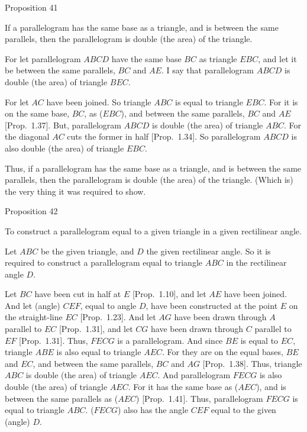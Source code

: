 
\begin{center}
{\large Proposition 41}
\end{center}

If a parallelogram has the same base as a triangle, and is between
the same parallels, then the parallelogram is double (the area) of the triangle.

\epsfysize=1.9in
\centerline{}

For let parallelogram $ABCD$ have the same base $BC$ as triangle $EBC$,
and let it be between the same parallels, $BC$ and $AE$. I say that 
parallelogram $ABCD$ is double (the area) of triangle $BEC$.

For let $AC$ have been joined. So triangle $ABC$ is equal to triangle
$EBC$. For it is on the same base, $BC$,  as ($EBC$), and between the same
parallels, $BC$ and $AE$ [Prop.~1.37]. But, parallelogram $ABCD$
is double (the area) of triangle $ABC$. For the diagonal $AC$ cuts
the former in half [Prop.~1.34]. So parallelogram $ABCD$ is also
double (the area) of triangle $EBC$.

Thus, if a parallelogram has the same base as a triangle, and is between
the same parallels, then the parallelogram is double (the area) of the triangle.
(Which is) the very thing it was required to show.


\begin{center}
{\large Proposition 42}
\end{center}

To construct a parallelogram equal to a given triangle in a given
rectilinear angle.

Let $ABC$ be the given triangle, and $D$ the given rectilinear angle. So
it is required to construct a parallelogram equal to triangle $ABC$
in the rectilinear angle $D$.

\epsfysize=1.9in
\centerline{}

Let $BC$ have been cut in half at $E$ [Prop.~1.10], and let $AE$ have been joined. And let (angle) $CEF$, equal to angle $D$,  have been constructed
at the point $E$ on the straight-line $EC$ [Prop.~1.23]. And let $AG$ have been drawn through $A$
parallel to $EC$ [Prop.~1.31], and let $CG$ have been drawn through $C$ parallel
to $EF$ [Prop.~1.31]. Thus, $FECG$ is a parallelogram. And since $BE$ is
equal to $EC$, triangle $ABE$ is also equal to triangle $AEC$. For they are
on the equal bases, $BE$ and $EC$, and between the same parallels, $BC$ and $AG$ [Prop.~1.38]. Thus, triangle $ABC$ is double (the area) of triangle $AEC$. And
parallelogram $FECG$ is also double (the area) of triangle $AEC$. For it has the same base as ($AEC$), and is between the same parallels  as ($AEC$) [Prop.~1.41].
Thus, parallelogram $FECG$ is equal to triangle $ABC$.  ($FECG$) also has
the angle $CEF$ equal to the given (angle) $D$.

